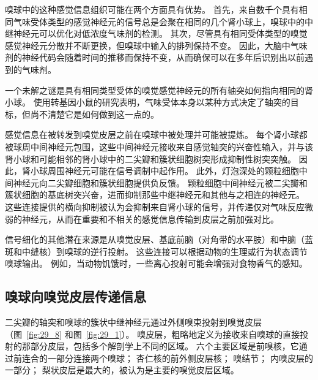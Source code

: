 嗅球中的这种感觉信息组织可能在两个方面具有优势。
首先，来自数千个具有相同气味受体类型的感觉神经元的信号总是会聚在相同的几个肾小球上，嗅球中的中继神经元可以优化对低浓度气味剂的检测。
其次，尽管具有相同受体类型的嗅觉感觉神经元分散并不断更换，但嗅球中输入的排列保持不变。
因此，大脑中气味剂的神经代码会随着时间的推移而保持不变，从而确保可以在多年后识别出以前遇到的气味剂。


一个未解之谜是具有相同类型受体的嗅觉感觉神经元的所有轴突如何指向相同的肾小球。
使用转基因小鼠的研究表明，气味受体本身以某种方式决定了轴突的目标，但尚不清楚它是如何做到这一点的。


感觉信息在被转发到嗅觉皮层之前在嗅球中被处理并可能被提炼。
每个肾小球都被球周中间神经元包围，这些中间神经元接收来自感觉轴突的兴奋性输入，并与该肾小球和可能相邻的肾小球中的二尖瓣和簇状细胞树突形成抑制性树突突触。
因此，肾小球周围神经元可能在信号调制中起作用。
此外，灯泡深处的颗粒细胞中间神经元向二尖瓣细胞和簇状细胞提供负反馈。
颗粒细胞中间神经元被二尖瓣和簇状细胞的基底树突兴奋，进而抑制那些中继神经元和其他与之相连的神经元。 
这些连接提供的横向抑制被认为会抑制来自肾小球的信号，并传递仅对气味反应微弱的神经元，从而在重要和不相关的感觉信息传输到皮层之前加强对比。


信号细化的其他潜在来源是从嗅觉皮层、基底前脑（对角带的水平肢）和中脑（蓝斑和中缝核）到嗅球的逆行投射。
这些连接可以根据动物的生理或行为状态调节嗅球输出。 
例如，当动物饥饿时，一些离心投射可能会增强对食物香气的感知。


\subsection{嗅球向嗅觉皮层传递信息}

二尖瓣的轴突和嗅球的簇状中继神经元通过外侧嗅束投射到嗅觉皮层（图~\ref{fig:29_8} 和图~\ref{fig:29_1}）。
嗅皮层，粗略地定义为接收来自嗅球的直接投射的那部分皮层，包括多个解剖学上不同的区域。
六个主要区域是前嗅核，它通过前连合的一部分连接两个嗅球；
杏仁核的前外侧皮层核；
嗅结节； 内嗅皮层的一部分；
梨状皮层是最大的，被认为是主要的嗅觉皮层区域。


